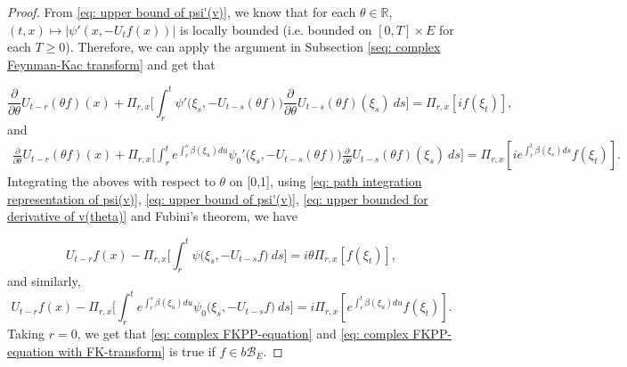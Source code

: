 \documentclass[12pt,oneside,english]{amsart}
\theoremstyle{plain}
\theoremstyle{definition}
\numberwithin{equation}{section}
\begin{document}
\begin{proof}
    From \eqref{eq: upper bound of psi'(v)}, we know that for each $\theta\in \mathbb R$, $(t,x) \mapsto |\psi'(x,-U_tf(x))|$ is locally bounded (i.e. bounded on $[0,T]\times E$ for each $T \geq 0$).
    Therefore, we can apply the argument in Subsection \ref{seq: complex Feynman-Kac transform} and get that

\[
    \frac{\partial}{\partial \theta} U_{t-r}(\theta f)(x) + \Pi_{r,x} \Big[\int_r^t \psi'\big(\xi_s,- U_{t-s}(\theta f)\big)\frac{\partial}{\partial \theta} U_{t-s}(\theta f)(\xi_s)~ds\Big]
    = \Pi_{r,x} [i f(\xi_t)],
\]
    and
\begin{align}
    \frac{\partial}{\partial \theta} U_{t-r}(\theta f)(x) + \Pi_{r,x} \Big[\int_r^t e^{\int_r^s \beta(\xi_u)du}\psi_0'\big(\xi_s,- U_{t-s}(\theta f)\big)\frac{\partial}{\partial \theta} U_{t-s}(\theta f)(\xi_s)~ds\Big]
    = \Pi_{r,x} [i e^{\int_r^t \beta(\xi_s)ds}f(\xi_t)].
\end{align}
    Integrating the aboves with respect to $\theta$  on [0,1], using \eqref{eq: path integration representation of psi(v)}, \eqref{eq: upper bound of psi'(v)}, \eqref{eq: upper bounded for derivative of v(theta)} and Fubini's theorem, we have

\begin{equation}
    U_{t-r}f(x) - \Pi_{r,x} \Big[\int_r^t \psi\big(\xi_s,-U_{t-s}f\big) ~ds\Big]
    = i\theta \Pi_{r,x} [f(\xi_t)],
\end{equation}
    and similarly,
\begin{equation}
    U_{t-r}f(x) - \Pi_{r,x} \Big[\int_r^t e^{\int_r^s \beta(\xi_u)du} \psi_0\big(\xi_s,- U_{t-s}f\big) ~ds\Big]
    = i\Pi_{r,x} [e^{\int_r^t\beta(\xi_u)du}f(\xi_t)].
\end{equation}
    Taking $r = 0$, we get that \eqref{eq: complex FKPP-equation} and \eqref{eq: complex FKPP-equation with FK-transform} is true if $f\in b\mathscr B_E$.


\end{proof}
\end{document}
